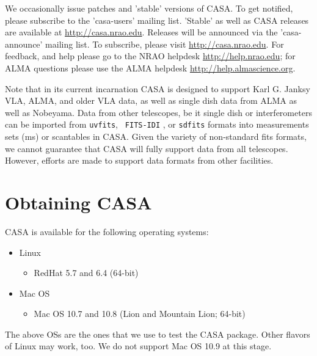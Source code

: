 We occasionally issue patches and 'stable' versions of CASA. To get
notified, please subscribe to the 'casa-users' mailing list. 'Stable'
as well as CASA releases are available at
\url{http://casa.nrao.edu}. Releases will be announced via the
'casa-announce' mailing list. To subscribe, please visit
\url{http://casa.nrao.edu}. For feedback, and help please go to the
NRAO helpdesk \url{http://help.nrao.edu}; for ALMA questions please
use the ALMA helpdesk \url{http://help.almascience.org}.

Note that in its current incarnation CASA is designed to support Karl
G. Janksy VLA, ALMA, and older VLA data, as well as single dish data
from ALMA as well as Nobeyama. Data from other telescopes, be it
single dish or interferometers can be imported from {\tt uvfits}, {\tt
  FITS-IDI} , or {\tt sdfits} formats into measurements sets (ms) or
scantables in CASA. Given the variety of non-standard fits formats, we
cannot guarantee that CASA will fully support data from all
telescopes. However, efforts are made to support data formats from
other facilities.




\section{Obtaining CASA}
\label{section:intro.obtaining}


CASA is available for the following operating systems:

\begin{itemize}
    \item Linux
      \begin{itemize}
          \item RedHat 5.7 and 6.4 (64-bit)
      \end{itemize}
      

    \item Mac OS
         \begin{itemize}
          \item Mac OS 10.7 and 10.8 (Lion and Mountain Lion; 64-bit)
\end{itemize}
\end{itemize}

The above OSs are the ones that we use to test the CASA package. Other
flavors of Linux may work, too. We do not support Mac OS 10.9 at this
stage. 


